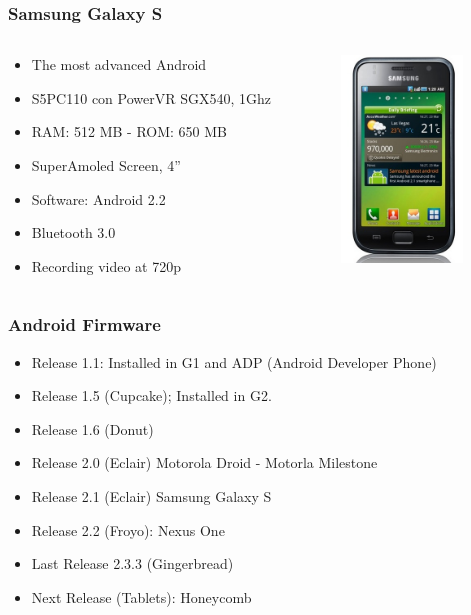 \documentclass{beamer}
\begin{document}
\begin{frame}
\frametitle{Samsung Galaxy S}

\begin{columns}
\begin{column}{0.5\textwidth}

\begin{itemize}

\item The most advanced Android
\item S5PC110 con PowerVR SGX540, 1Ghz
\item RAM: 512 MB - ROM: 650 MB
\item SuperAmoled Screen, 4''
\item Software: Android 2.2
\item Bluetooth 3.0
\item Recording video at 720p
\end{itemize}
\end{column}

\begin{column}{0.5\textwidth}
\begin{center}
  \includegraphics[height=5.5cm]{figs/samsung-galaxy-s}
\end{center}
\end{column}
\end{columns}
\end{frame}


\begin {frame}
\frametitle{Android Firmware}

\begin{itemize}
\item Release 1.1: Installed in G1 and ADP (Android Developer Phone)
\item Release 1.5 (Cupcake); Installed in G2.
\item Release 1.6 (Donut)
\item Release 2.0 (Eclair) Motorola Droid - Motorla Milestone
\item Release 2.1 (Eclair) Samsung Galaxy S
\item Release 2.2 (Froyo): Nexus One
\item Last Release 2.3.3 (Gingerbread)
\item Next Release (Tablets): Honeycomb
\end{itemize}

\begin{center}
\end{center}

\end{frame}
\end{document}
